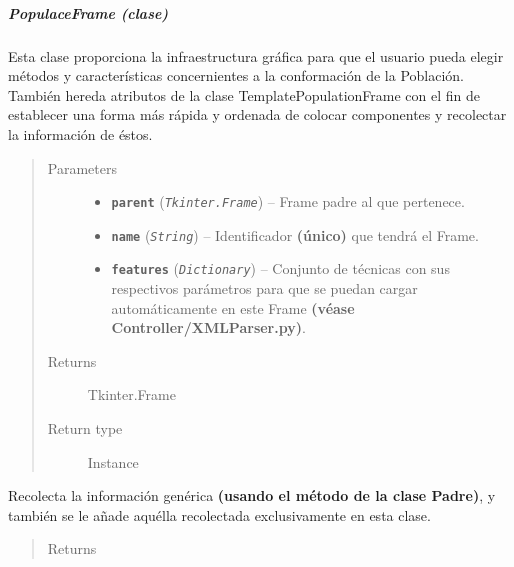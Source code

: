 \documentclass[class=report, crop=false]{standalone}
\begin{document}
\subparagraph{PopulaceFrame (clase)}
\label{sec:a_3_2_4_2_1}
\begin{fulllineitems}

\begin{DUlineblock}{0em}
\item[] Esta clase proporciona la infraestructura gráfica para que 
el usuario pueda elegir métodos y características concernientes a 
la conformación de la Población.\break
También hereda atributos de la clase TemplatePopulationFrame con el 
fin de establecer una forma más rápida y ordenada de colocar componentes 
y recolectar la información de éstos.
\end{DUlineblock}

\begin{quote}\begin{description}
\item[{Parameters}] \leavevmode\begin{itemize}
\item \textbf{\texttt{parent}} (\emph{\texttt{Tkinter.Frame}}) -- Frame padre al que pertenece.
\item \textbf{\texttt{name}} (\emph{\texttt{String}}) -- Identificador \textbf{(único)} que tendrá el Frame.
\item \textbf{\texttt{features}} (\emph{\texttt{Dictionary}}) -- Conjunto de técnicas con sus respectivos parámetros para que se puedan cargar automáticamente en este Frame \textbf{(véase Controller/XMLParser.py)}.
\end{itemize}

\item[{Returns}] \leavevmode
Tkinter.Frame
\item[{Return type}] \leavevmode
Instance
\end{description}\end{quote}


\begin{fulllineitems}

Recolecta la información genérica \textbf{(usando el método de la clase Padre)}, 
y también se le añade aquélla recolectada exclusivamente 
en esta clase.

\begin{quote}\begin{description}
\item[{Returns}] \leavevmode


\end{description}
\end{quote}
\end{fulllineitems}
\end{fulllineitems}
\end{document}

